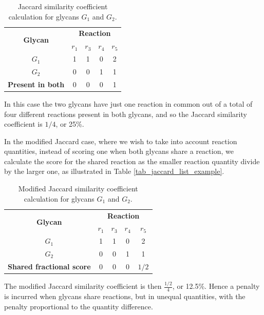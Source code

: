 \documentclass[12pt,a4paper]{article}
\begin{document}
\begin{table}[h]
\centering
\begin{tabular}{|c|c|c|c|c|} \hline
\multirow{2}{*}{\bf Glycan} & \multicolumn{4}{|c|}{\bf Reaction}\\  \cline{2-5}
& {\bf $r_1$} & {\bf $r_3$} & {\bf $r_4$} & {\bf $r_5$} \\ \hline
$G_1$ & 1 & 1 & 0 & 2 \\ \hline
$G_2$ & 0 & 0 & 1 & 1 \\ \hline
{\bf Present in both} & 0 & 0 & 0 & 1 \\ \hline
\end{tabular}
\caption{Jaccard similarity coefficient calculation for glycans $G_1$ and $G_2$.}
\label{tab:jaccard_set_example}
\end{table}

In this case the two glycans have just one reaction in common out of a total of four different reactions present in both glycans, and so the Jaccard similarity coefficient is $1/4$, or 25\%.

In the modified Jaccard case, where we wish to take into account reaction quantities, instead of scoring one when both glycans share a reaction, we calculate the score for the shared reaction as the smaller reaction quantity divide by the larger one, as illustrated in Table \ref{tab_jaccard_list_example}.

\begin{table}[h]
\centering
\begin{tabular}{|c|c|c|c|c|} \hline
\multirow{2}{*}{\bf Glycan} & \multicolumn{4}{|c|}{\bf Reaction}\\  \cline{2-5}
& {\bf $r_1$} & {\bf $r_3$} & {\bf $r_4$} & {\bf $r_5$} \\ \hline
$G_1$ & 1 & 1 & 0 & 2 \\ \hline
$G_2$ & 0 & 0 & 1 & 1 \\ \hline
{\bf Shared fractional score} & 0 & 0 & 0 & $1/2$ \\ \hline
\end{tabular}
\caption{Modified Jaccard similarity coefficient calculation for glycans $G_1$ and $G_2$.}
\label{tab:jaccard_list_example}
\end{table}

The modified Jaccard similarity coefficient is then $\frac{1/2}{4}$, or 12.5\%. Hence a penalty is incurred when glycans share reactions, but in unequal quantities, with the penalty proportional to the quantity difference.
\end{document}
